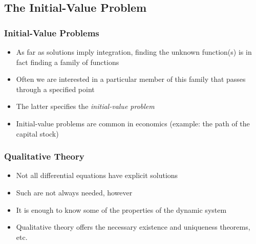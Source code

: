 \documentclass[10pt,usenames,dvipsnames]{beamer}
\theoremstyle{definition}
\begin{document}
\subsection{The Initial-Value Problem}
\begin{frame}[fragile]
\frametitle{Initial-Value Problems}
\begin{itemize}
	\item As far as solutions imply integration, finding the unknown function(s) is in fact finding a family of functions
	\item Often we are interested in a particular member of this family that passes through a specified point
	\item The latter specifies the \textit{initial-value problem}
	\item Initial-value problems are common in economics (example: the path of the capital stock)
\end{itemize}
\end{frame}

\begin{frame}[fragile]
\frametitle{Qualitative Theory}
\begin{itemize}
	\item Not all differential equations have explicit solutions
	\item Such are not always needed, however
	\item It is enough to know some of the properties of the dynamic system
	\item Qualitative theory offers the necessary existence and uniqueness theorems, etc.
\end{itemize}
\end{frame}
\end{document}
